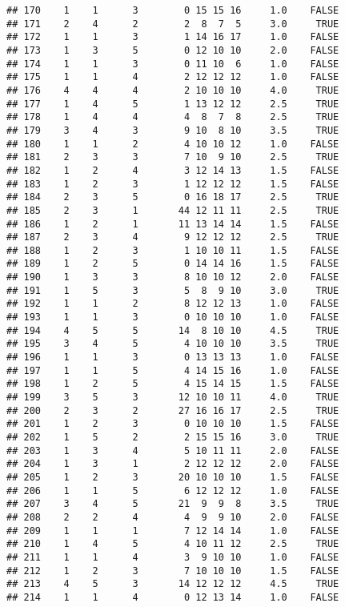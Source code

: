 \documentclass[]{article}
\begin{document}
\begin{verbatim}
## 170    1    1      3        0 15 15 16     1.0    FALSE
## 171    2    4      2        2  8  7  5     3.0     TRUE
## 172    1    1      3        1 14 16 17     1.0    FALSE
## 173    1    3      5        0 12 10 10     2.0    FALSE
## 174    1    1      3        0 11 10  6     1.0    FALSE
## 175    1    1      4        2 12 12 12     1.0    FALSE
## 176    4    4      4        2 10 10 10     4.0     TRUE
## 177    1    4      5        1 13 12 12     2.5     TRUE
## 178    1    4      4        4  8  7  8     2.5     TRUE
## 179    3    4      3        9 10  8 10     3.5     TRUE
## 180    1    1      2        4 10 10 12     1.0    FALSE
## 181    2    3      3        7 10  9 10     2.5     TRUE
## 182    1    2      4        3 12 14 13     1.5    FALSE
## 183    1    2      3        1 12 12 12     1.5    FALSE
## 184    2    3      5        0 16 18 17     2.5     TRUE
## 185    2    3      1       44 12 11 11     2.5     TRUE
## 186    1    2      1       11 13 14 14     1.5    FALSE
## 187    2    3      4        9 12 12 12     2.5     TRUE
## 188    1    2      3        1 10 10 11     1.5    FALSE
## 189    1    2      5        0 14 14 16     1.5    FALSE
## 190    1    3      3        8 10 10 12     2.0    FALSE
## 191    1    5      3        5  8  9 10     3.0     TRUE
## 192    1    1      2        8 12 12 13     1.0    FALSE
## 193    1    1      3        0 10 10 10     1.0    FALSE
## 194    4    5      5       14  8 10 10     4.5     TRUE
## 195    3    4      5        4 10 10 10     3.5     TRUE
## 196    1    1      3        0 13 13 13     1.0    FALSE
## 197    1    1      5        4 14 15 16     1.0    FALSE
## 198    1    2      5        4 15 14 15     1.5    FALSE
## 199    3    5      3       12 10 10 11     4.0     TRUE
## 200    2    3      2       27 16 16 17     2.5     TRUE
## 201    1    2      3        0 10 10 10     1.5    FALSE
## 202    1    5      2        2 15 15 16     3.0     TRUE
## 203    1    3      4        5 10 11 11     2.0    FALSE
## 204    1    3      1        2 12 12 12     2.0    FALSE
## 205    1    2      3       20 10 10 10     1.5    FALSE
## 206    1    1      5        6 12 12 12     1.0    FALSE
## 207    3    4      5       21  9  9  8     3.5     TRUE
## 208    2    2      4        4  9  9 10     2.0    FALSE
## 209    1    1      1        7 12 14 14     1.0    FALSE
## 210    1    4      5        4 10 11 12     2.5     TRUE
## 211    1    1      4        3  9 10 10     1.0    FALSE
## 212    1    2      3        7 10 10 10     1.5    FALSE
## 213    4    5      3       14 12 12 12     4.5     TRUE
## 214    1    1      4        0 12 13 14     1.0    FALSE

\end{verbatim}
\end{document}
